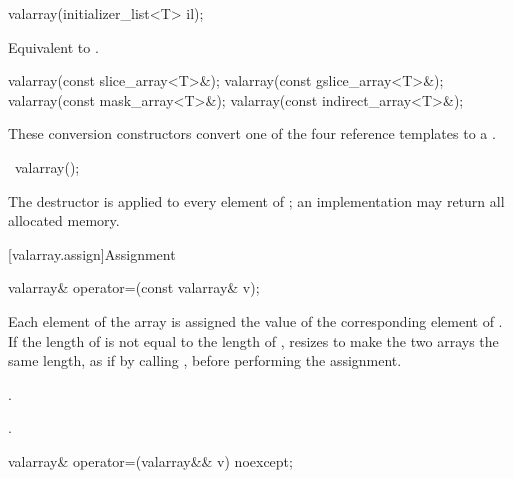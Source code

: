 %
\begin{itemdecl}
valarray(initializer_list<T> il);
\end{itemdecl}

\begin{itemdescr}
\pnum
\effects Equivalent to .
\end{itemdescr}

%
\begin{itemdecl}
valarray(const slice_array<T>&);
valarray(const gslice_array<T>&);
valarray(const mask_array<T>&);
valarray(const indirect_array<T>&);
\end{itemdecl}

\begin{itemdescr}
\pnum
These conversion constructors convert one of the four reference templates
to a
.
\end{itemdescr}

%
\begin{itemdecl}
~valarray();
\end{itemdecl}

\begin{itemdescr}
\pnum
\effects
The destructor is applied to every element of
;
an implementation may return all allocated memory.
\end{itemdescr}

[valarray.assign]{Assignment}

%
\begin{itemdecl}
valarray& operator=(const valarray& v);
\end{itemdecl}

\begin{itemdescr}
\pnum
\effects
Each element of the
array is assigned the value of the corresponding element of .
If the length of  is not equal to the length of ,
resizes  to make the two arrays the same length,
as if by calling , before performing the assignment.

\pnum
\ensures {}.

\pnum
\returns {}.
\end{itemdescr}

%
\begin{itemdecl}
valarray& operator=(valarray&& v) noexcept;
\end{itemdecl}

